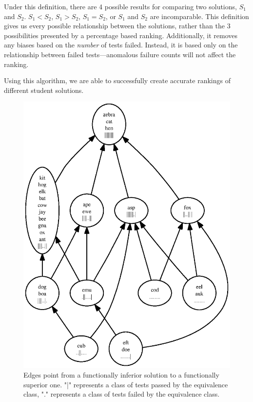 \documentclass[11pt,twoside]{article}
\begin{document}
Under this definition, there are 4 possible results for comparing two solutions, $S_1$ and $S_2$. $S_1 < S_2$, $S_1 > S_2$, $S_1 = S_2$, or $S_1$ and $S_2$  are incomparable. This definition gives us every possible relationship between the solutions, rather than the 3 possibilities presented by a percentage based ranking. Additionally, it removes any biases based on the \emph{number} of tests failed. Instead, it is based only on the relationship between failed tests---anomalous failure counts will not affect the ranking.

Using this algorithm, we are able to successfully create accurate rankings of different student solutions.

\begin{figure}
\centering
\includegraphics{rank1.ps}
\caption{Edges point from a functionally inferior solution to a functionally superior one. "|" represents a class of tests passed by the equivalence class, "." represents a class of tests failed by the equivalence class.}
\end{figure}
\end{document}
